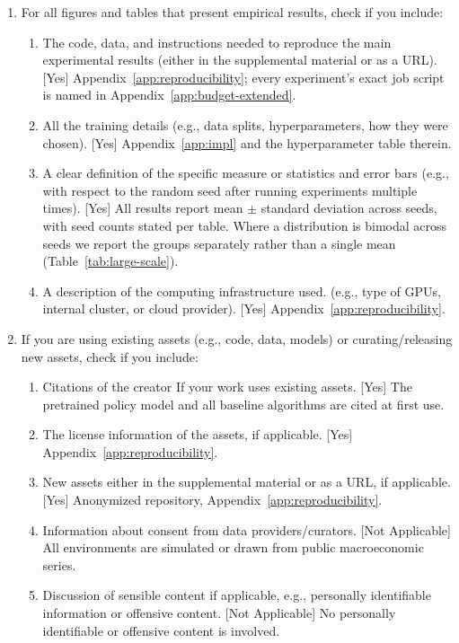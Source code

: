 \documentclass[twoside]{article}
\theoremstyle{plain}
\theoremstyle{definition}
\theoremstyle{remark}
\begin{document}
\begin{enumerate}
  \item For all figures and tables that present empirical results, check if you include:
  \begin{enumerate}
    \item The code, data, and instructions needed to reproduce the main experimental results (either in the supplemental material or as a URL). [Yes] Appendix~\ref{app:reproducibility}; every experiment's exact job script is named in Appendix~\ref{app:budget-extended}.
    \item All the training details (e.g., data splits, hyperparameters, how they were chosen). [Yes] Appendix~\ref{app:impl} and the hyperparameter table therein.
    \item A clear definition of the specific measure or statistics and error bars (e.g., with respect to the random seed after running experiments multiple times). [Yes] All results report mean $\pm$ standard deviation across seeds, with seed counts stated per table. Where a distribution is bimodal across seeds we report the groups separately rather than a single mean (Table~\ref{tab:large-scale}).
    \item A description of the computing infrastructure used. (e.g., type of GPUs, internal cluster, or cloud provider). [Yes] Appendix~\ref{app:reproducibility}.
  \end{enumerate}

  \item If you are using existing assets (e.g., code, data, models) or curating/releasing new assets, check if you include:
  \begin{enumerate}
    \item Citations of the creator If your work uses existing assets. [Yes] The pretrained policy model and all baseline algorithms are cited at first use.
    \item The license information of the assets, if applicable. [Yes] Appendix~\ref{app:reproducibility}.
    \item New assets either in the supplemental material or as a URL, if applicable. [Yes] Anonymized repository, Appendix~\ref{app:reproducibility}.
    \item Information about consent from data providers/curators. [Not Applicable] All environments are simulated or drawn from public macroeconomic series.
    \item Discussion of sensible content if applicable, e.g., personally identifiable information or offensive content. [Not Applicable] No personally identifiable or offensive content is involved.
  \end{enumerate}


\end{enumerate}
\end{document}
